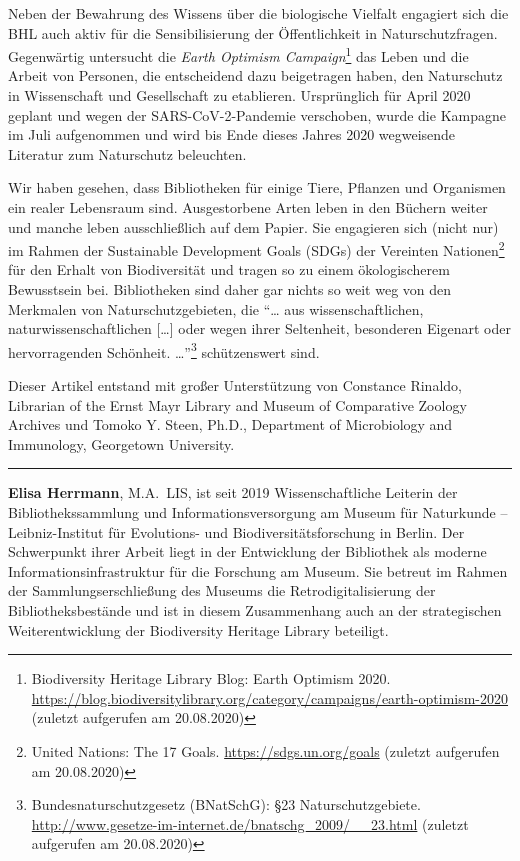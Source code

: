 \documentclass[a4paper,
fontsize=11pt,
oneside,
numbers=noperiodatend,
parskip=half-,
bibliography=totoc,
final
]{scrartcl}
\begin{document}
Neben der Bewahrung des Wissens über die biologische Vielfalt engagiert
sich die BHL auch aktiv für die Sensibilisierung der Öffentlichkeit in
Naturschutzfragen. Gegenwärtig untersucht die \emph{Earth Optimism
Campaign}\footnote{Biodiversity Heritage Library Blog: Earth Optimism
  2020.
  \url{https://blog.biodiversitylibrary.org/category/campaigns/earth-optimism-2020}
  (zuletzt aufgerufen am 20.08.2020)} das Leben und die Arbeit von
Personen, die entscheidend dazu beigetragen haben, den Naturschutz in
Wissenschaft und Gesellschaft zu etablieren. Ursprünglich für April 2020
geplant und wegen der SARS-CoV-2-Pandemie verschoben, wurde die Kampagne
im Juli aufgenommen und wird bis Ende dieses Jahres 2020 wegweisende
Literatur zum Naturschutz beleuchten.

Wir haben gesehen, dass Bibliotheken für einige Tiere, Pflanzen und
Organismen ein realer Lebensraum sind. Ausgestorbene Arten leben in den
Büchern weiter und manche leben ausschließlich auf dem Papier. Sie
engagieren sich (nicht nur) im Rahmen der Sustainable Development Goals
(SDGs) der Vereinten Nationen\footnote{United Nations: The 17 Goals.
  \url{https://sdgs.un.org/goals} (zuletzt aufgerufen am 20.08.2020)}
für den Erhalt von Biodiversität und tragen so zu einem ökologischerem
Bewusstsein bei. Bibliotheken sind daher gar nichts so weit weg von den
Merkmalen von Naturschutzgebieten, die \enquote{\ldots{} aus
wissenschaftlichen, naturwissenschaftlichen {[}\ldots{]} oder wegen
ihrer Seltenheit, besonderen Eigenart oder hervorragenden Schönheit.
\ldots{}}\footnote{Bundesnaturschutzgesetz (BNatSchG): §23
  Naturschutzgebiete.
  \url{http://www.gesetze-im-internet.de/bnatschg_2009/__23.html}
  (zuletzt aufgerufen am 20.08.2020)} schützenswert sind.

Dieser Artikel entstand mit großer Unterstützung von Constance Rinaldo,
Librarian of the Ernst Mayr Library and Museum of Comparative Zoology
Archives und Tomoko Y. Steen, Ph.D., Department of Microbiology and
Immunology, Georgetown University.

\begin{center}\rule{0.5\linewidth}{0.5pt}\end{center}

\textbf{Elisa Herrmann}, M.A.~LIS, ist seit 2019
Wissenschaftliche Leiterin der Bibliothekssammlung und
Informationsversorgung am Museum für Naturkunde -- Leibniz-Institut für
Evolutions- und Biodiversitätsforschung in Berlin. Der Schwerpunkt ihrer
Arbeit liegt in der Entwicklung der Bibliothek als moderne
Informationsinfrastruktur für die Forschung am Museum. Sie betreut im
Rahmen der Sammlungserschließung des Museums die Retrodigitalisierung
der Bibliotheksbestände und ist in diesem Zusammenhang auch an der
strategischen Weiterentwicklung der Biodiversity Heritage Library
beteiligt.
\end{document}
